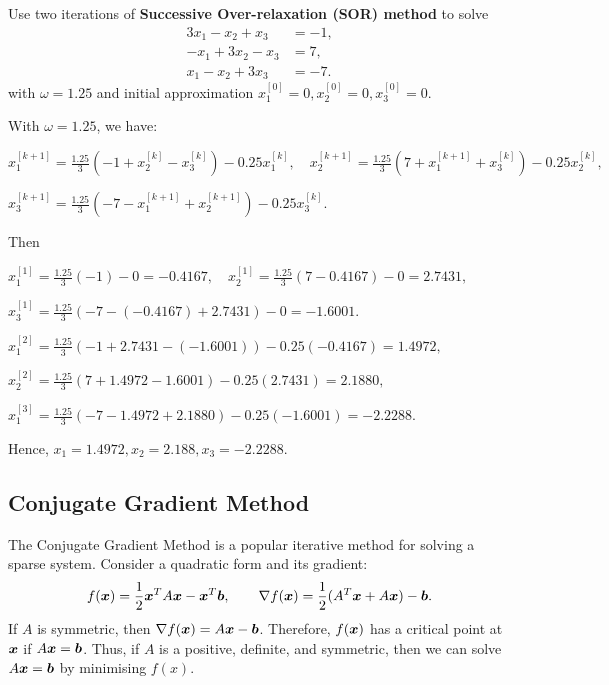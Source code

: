 \begin{example}
Use two iterations of \textbf{Successive Over-relaxation (SOR) method} to solve
\[
\begin{aligned}
3x_1-x_2+x_3&=-1,\\
-x_1+3x_2-x_3&=7,\\
x_1-x_2+3x_3&=-7.
\end{aligned}
\]
with $\omega = 1.25$ and initial approximation $x_1^{[0]}=0,x_2^{[0]}=0,x_3^{[0]}=0$.
\end{example}

\begin{solution}[5.5cm]
With $\omega=1.25$, we have:

\smallskip
\noindent
\(\displaystyle
x_1^{[k+1]}=\frac{1.25}{3}(-1+x_2^{[k]}-x_3^{[k]})-0.25x_1^{[k]}, 
\quad x_2^{[k+1]}=\frac{1.25}{3}(7+x_1^{[k+1]}+x_3^{[k]})-0.25x_2^{[k]},
\)

\smallskip \noindent
\(\displaystyle x_3^{[k+1]}=\frac{1.25}{3}(-7-x_1^{[k+1]}+x_2^{[k+1]})-0.25x_3^{[k]}.\)

\noindent Then

\smallskip
\(\displaystyle
x_1^{[1]}=\frac{1.25}{3}(-1)-0=-0.4167, \quad x_2^{[1]}=\frac{1.25}{3}(7-0.4167)-0=2.7431,
\)

\smallskip
\(\displaystyle
x_3^{[1]}=\frac{1.25}{3}(-7-(-0.4167)+2.7431)-0=-1.6001.
\)

\bigskip
\(\displaystyle
x_1^{[2]}=\frac{1.25}{3}(-1+2.7431-(-1.6001))-0.25(-0.4167)=1.4972, \)

\smallskip
\(\displaystyle x_2^{[2]}=\frac{1.25}{3}(7+1.4972-1.6001)-0.25(2.7431)=2.1880,
\)

\smallskip
\(\displaystyle
x_1^{[3]}=\frac{1.25}{3}(-7-1.4972+2.1880)-0.25(-1.6001)=-2.2288.
\)

\medskip \noindent
Hence, $x_1 = 1.4972, x_2 = 2.188, x_3 = -2.2288$.
\end{solution}

\subsection{Conjugate Gradient Method}
The Conjugate Gradient Method is a popular iterative method for solving a sparse system. Consider a quadratic form and its gradient:
\[
f(\boldsymbol{x}) = \frac12 \boldsymbol{x}^TA \boldsymbol{x} - \boldsymbol{x}^T \boldsymbol{b},
\qquad \nabla f(\boldsymbol{x}) = \frac12 (A^T\boldsymbol{x} + A\boldsymbol{x}) - \boldsymbol{b}.
\]
If $A$ is symmetric, then $\nabla f(\boldsymbol{x}) = A\boldsymbol{x} - \boldsymbol{b}$.
Therefore, $f(\boldsymbol{x})$ has a critical point at $\boldsymbol{x}$ if $A\boldsymbol{x} = \boldsymbol{b}$. Thus, if $A$ is a positive, definite, and symmetric, then we can solve $A\boldsymbol{x} = \boldsymbol{b}$ by minimising $f(x)$.

